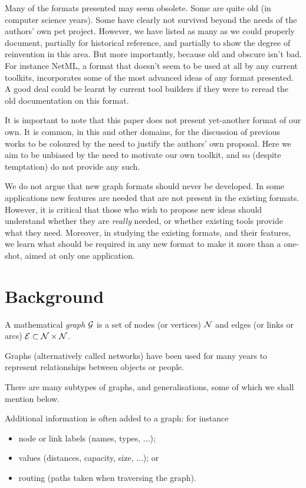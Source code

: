 \documentclass{sig-alternate}
\begin{document}
Many of the formats presented may seem obsolete. Some are quite old
(in computer science years). Some have clearly not survived beyond the
needs of the authors' own pet project. However, we have listed as many
as we could properly document, partially for historical reference, and
partially to show the degree of reinvention in this area. But more
importantly, because old and obscure isn't bad. For instance NetML, a
format that doesn't seem to be used at all by any current toolkits,
incorporates some of the most advanced ideas of any format
presented. A good deal could be learnt by current tool builders if
they were to reread the old documentation on this format.

It is important to note that this paper does not present yet-another
format of our own. It is common, in this and other domains, for the
discussion of previous works to be coloured by the need to justify the
authors' own proposal. Here we aim to be unbiased by the need to
motivate our own toolkit, and so (despite temptation) do not provide
any such.

We do not argue that new graph formats should never be
developed. In some applications new features are needed that are not
present in the existing formats. However, it is critical that those
who wish to propose new ideas should understand whether they are {\em
  really} needed, or whether existing tools provide what they
need. Moreover, in studying the existing formats, and their features,
we learn what should be required in any new format to make it more
than a one-shot, aimed at only one application.



\section{Background}

A mathematical {\em graph} ${\cal G}$ is a set of nodes (or vertices)
${\cal N}$ and edges (or links or arcs) ${\cal E} \subset {\cal N}
\times {\cal N}$.

Graphs (alternatively called networks) have been used for many years
to represent relationships between objects or people. 

There are many subtypes of graphs, and generalisations, some of which
we shall mention below. 

Additional information is often added to a graph: for instance
\begin{itemize}

\item node or link labels (names, types, ...);

\item values (distances, capacity, size, ...); or 

\item routing (paths taken when traversing the graph).

\end{itemize}
\end{document}
